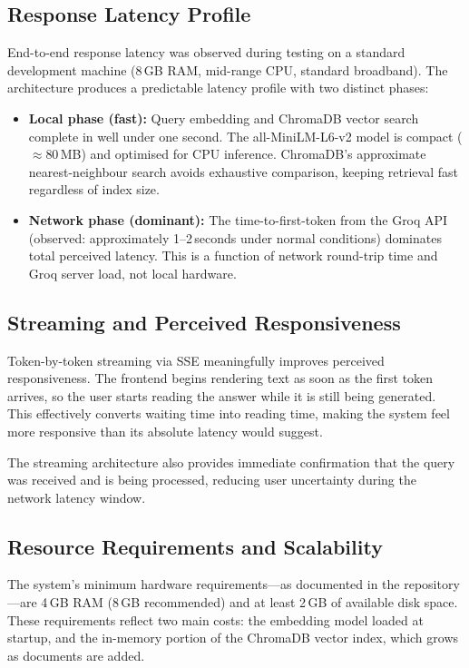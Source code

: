 \subsection{Response Latency Profile}

End-to-end response latency was observed during testing on a standard
development machine (8\,GB RAM, mid-range CPU, standard broadband). The
architecture produces a predictable latency profile with two distinct
phases:

\begin{itemize}[leftmargin=1.5em, itemsep=3pt]
    \item \textbf{Local phase (fast):} Query embedding and ChromaDB
    vector search complete in well under one second. The all-MiniLM-L6-v2
    model is compact ($\approx$80\,MB) and optimised for CPU inference.
    ChromaDB's approximate nearest-neighbour search avoids exhaustive
    comparison, keeping retrieval fast regardless of index size.

    \item \textbf{Network phase (dominant):} The time-to-first-token
    from the Groq API (observed: approximately 1--2\,seconds under
    normal conditions) dominates total perceived latency. This is a
    function of network round-trip time and Groq server load, not local
    hardware.
\end{itemize}

\subsection{Streaming and Perceived Responsiveness}

Token-by-token streaming via SSE meaningfully improves perceived
responsiveness. The frontend begins rendering text as soon as the first
token arrives, so the user starts reading the answer while it is still
being generated. This effectively converts waiting time into reading
time, making the system feel more responsive than its absolute latency
would suggest.

The streaming architecture also provides immediate confirmation that
the query was received and is being processed, reducing user uncertainty
during the network latency window.

\subsection{Resource Requirements and Scalability}

The system's minimum hardware requirements---as documented in the
repository---are 4\,GB RAM (8\,GB recommended) and at least 2\,GB of
available disk space. These requirements reflect two main costs: the
embedding model loaded at startup, and the in-memory portion of the
ChromaDB vector index, which grows as documents are added.

